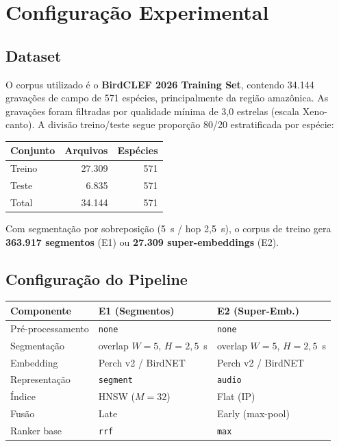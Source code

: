 \documentclass[12pt,a4paper]{article}
\begin{document}
\section{Configuração Experimental}
\label{sec:experimentos}

\subsection{Dataset}

O corpus utilizado é o \textbf{BirdCLEF 2026 Training Set}, contendo 34.144
gravações de campo de 571 espécies, principalmente da região amazônica. As
gravações foram filtradas por qualidade mínima de 3,0 estrelas (escala Xeno-canto).
A divisão treino/teste segue proporção 80/20 estratificada por espécie:
\begin{center}
\begin{tabular}{lrr}
\toprule
\textbf{Conjunto} & \textbf{Arquivos} & \textbf{Espécies} \\
\midrule
Treino & 27.309 & 571 \\
Teste  &  6.835 & 571 \\
\midrule
Total  & 34.144 & 571 \\
\bottomrule
\end{tabular}
\end{center}

Com segmentação por sobreposição (5~s / hop 2,5~s), o corpus de treino gera
\textbf{363.917 segmentos} (E1) ou \textbf{27.309 super-embeddings} (E2).

\subsection{Configuração do Pipeline}

\begin{center}
\begin{tabular}{lll}
\toprule
\textbf{Componente} & \textbf{E1 (Segmentos)} & \textbf{E2 (Super-Emb.)} \\
\midrule
Pré-processamento  & \texttt{none}      & \texttt{none} \\
Segmentação        & overlap $W=5$, $H=2{,}5$~s & overlap $W=5$, $H=2{,}5$~s \\
Embedding          & Perch v2 / BirdNET & Perch v2 / BirdNET \\
Representação      & \texttt{segment}   & \texttt{audio} \\
Índice             & HNSW ($M=32$)      & Flat (IP) \\
Fusão              & Late               & Early (max-pool) \\
Ranker base        & \texttt{rrf}       & \texttt{max} \\
\bottomrule
\end{tabular}
\end{center}
\end{document}
